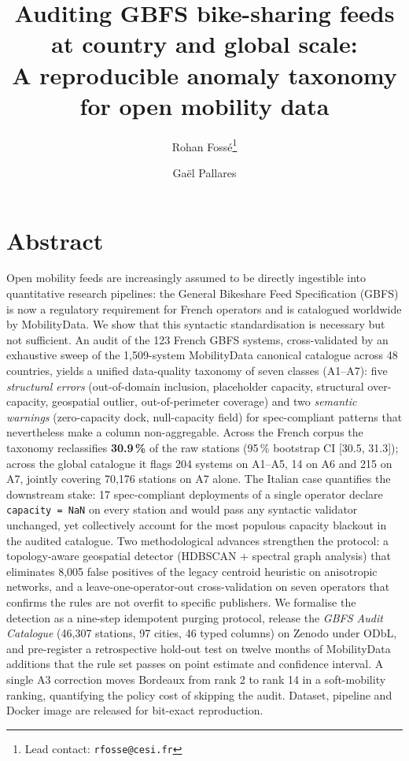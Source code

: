 \documentclass[11pt,a4paper]{article}
\title{\bfseries\sffamily\Large Auditing GBFS bike-sharing feeds at country and global scale:\\
A reproducible anomaly taxonomy for open mobility data}
\author[1]{Rohan Foss\'e\thanks{Lead contact: \texttt{rfosse@cesi.fr}}}
\author[2]{Ga\"el Pallares}
\affil[1]{CESI Engineering School, Montpellier, France}
\affil[2]{CESI LINEACT (EA 7527), Montpellier, France}
\date{}
\begin{document}
\maketitle

%

\section*{Abstract}
\noindent
Open mobility feeds are increasingly assumed to be directly ingestible
into quantitative research pipelines: the General Bikeshare Feed
Specification (GBFS) is now a regulatory requirement for French
operators and is catalogued worldwide by MobilityData. We show that
this syntactic standardisation is necessary but not sufficient. An
audit of the 123 French GBFS systems, cross-validated by an
exhaustive sweep of the 1{,}509-system MobilityData canonical
catalogue across 48 countries, yields a unified data-quality
taxonomy of seven classes (A1--A7): five \emph{structural errors}
(out-of-domain inclusion, placeholder capacity, structural
over-capacity, geospatial outlier, out-of-perimeter coverage) and
two \emph{semantic warnings} (zero-capacity dock, null-capacity
field) for spec-compliant patterns that nevertheless make a
column non-aggregable. Across the French corpus the taxonomy
reclassifies \textbf{30.9\,\%} of the raw stations (95\,\%
bootstrap CI [30.5, 31.3]); across the global catalogue it flags
204 systems on A1--A5, 14 on A6 and 215 on A7, jointly covering
70{,}176 stations on A7 alone. The Italian case quantifies the
downstream stake: 17 spec-compliant deployments of a single
operator declare \texttt{capacity = NaN} on every station and
would pass any syntactic validator unchanged, yet collectively
account for the most populous capacity blackout in the audited
catalogue. Two methodological advances strengthen the protocol:
a topology-aware geospatial detector (HDBSCAN + spectral graph
analysis) that eliminates 8{,}005 false positives of the legacy
centroid heuristic on anisotropic networks, and a
leave-one-operator-out cross-validation on seven operators that
confirms the rules are not overfit to specific publishers. We
formalise the detection as a nine-step idempotent purging protocol,
release the \emph{GBFS Audit Catalogue} (46{,}307 stations,
97 cities, 46 typed columns) on Zenodo under ODbL, and pre-register
a retrospective hold-out test on twelve months of MobilityData
additions that the rule set passes on point estimate and confidence
interval. A single A3 correction moves Bordeaux from rank 2 to
rank 14 in a soft-mobility ranking, quantifying the policy cost of
skipping the audit. Dataset, pipeline and Docker image are released
for bit-exact reproduction.
\end{document}

